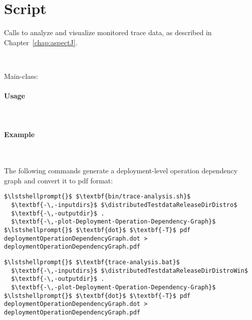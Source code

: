 \section{Script }\label{appendix:wrapperScripts:traceAnalysis}

Calls \KiekerTraceAnalysis{} to analyze and visualize monitored trace data, %
as described in Chapter~\ref{chap:aspectJ}.

\

\noindent Main-class: {\small {}}


\paragraph*{Usage}\

\enlargethispage{1cm}

\setTextListing


\paragraph*{Example}\

\noindent The following commands generate a deployment-level operation dependency 
graph and convert it to pdf format:

\enlargethispage{1cm}

\setTextListing
\begin{lstlisting}[caption=Execution under UNIX-like systems]
$\lstshellprompt{}$ $\textbf{bin/trace-analysis.sh}$
  $\textbf{-\,-inputdirs}$ $\distributedTestdataReleaseDirDistro$ 
  $\textbf{-\,-outputdir}$ . 
  $\textbf{-\,-plot-Deployment-Operation-Dependency-Graph}$
$\lstshellprompt{}$ $\textbf{dot}$ $\textbf{-T}$ pdf  deploymentOperationDependencyGraph.dot > deploymentOperationDependencyGraph.pdf
\end{lstlisting}

\begin{lstlisting}[caption=Execution under Windows]
$\lstshellprompt{}$ $\textbf{trace-analysis.bat}$
  $\textbf{-\,-inputdirs}$ $\distributedTestdataReleaseDirDistroWin$ 
  $\textbf{-\,-outputdir}$ . 
  $\textbf{-\,-plot-Deployment-Operation-Dependency-Graph}$
$\lstshellprompt{}$ $\textbf{dot}$ $\textbf{-T}$ pdf  deploymentOperationDependencyGraph.dot > deploymentOperationDependencyGraph.pdf
\end{lstlisting}


